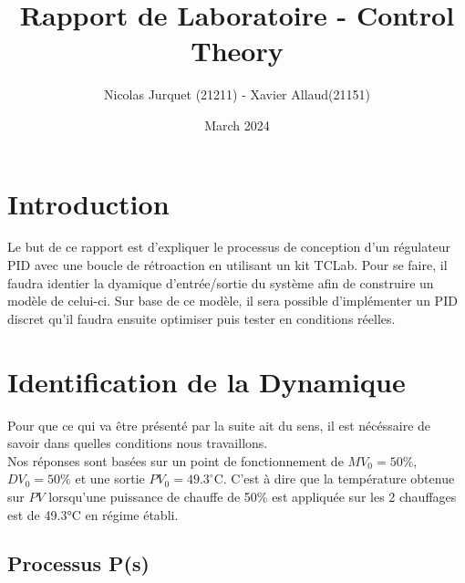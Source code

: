 \documentclass{article}
\title{Rapport de Laboratoire - Control Theory}
\author{Nicolas Jurquet (21211) - Xavier Allaud(21151)}
\date{March 2024}
\begin{document}
\maketitle

\section{Introduction}
Le but de ce rapport est d'expliquer le processus de conception d'un régulateur PID avec une boucle de rétroaction en utilisant un kit TCLab. Pour se faire, il faudra identier la dyamique d'entrée/sortie du système afin de construire un modèle de celui-ci. Sur base de ce modèle, il sera possible d'implémenter un PID discret qu'il faudra ensuite optimiser puis tester en conditions réelles.
\tableofcontents

\newpage

\section{Identification de la Dynamique}
Pour que ce qui va être présenté par la suite ait du sens, il est nécéssaire de savoir dans quelles conditions nous travaillons.\\
Nos réponses sont basées sur un point de fonctionnement de $MV_0 = 50\%$, $DV_0 = 50\%$ et une sortie $PV_0 = 49.3^{\circ}$C. 
C'est à dire que la température obtenue sur $PV$ lorsqu'une puissance de chauffe de 50\% est appliquée sur les 2 chauffages est de 49.3°C en régime établi.

\subsection{Processus P(s)}
\end{document}

